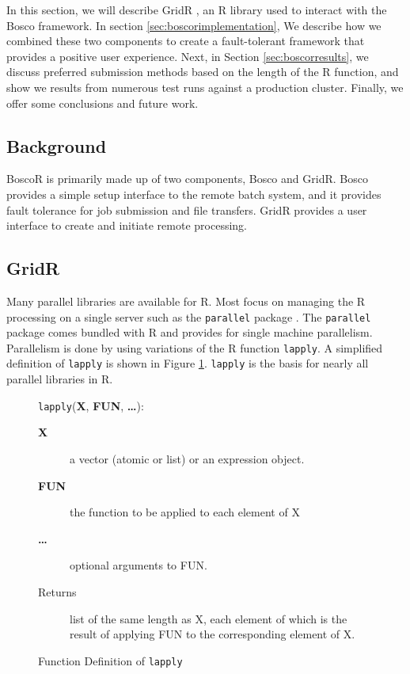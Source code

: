 In this section, we will describe GridR \cite{wegener2007gridr}, an R library used to interact with the Bosco framework.  In section \ref{sec:boscorimplementation}, We describe how we combined these two components to create a fault-tolerant framework that provides a positive user experience.  Next, in Section \ref{sec:boscorresults}, we discuss preferred submission methods based on the length of the R function, and show we results from numerous test runs against a production cluster.  Finally, we offer some conclusions and future work.

\subsection{Background}
BoscoR is primarily made up of two components, Bosco and GridR.  Bosco provides a simple setup interface to the remote batch system, and it provides fault tolerance for job submission and file transfers.  GridR provides a user interface to create and initiate remote processing.


\subsection{GridR}
Many parallel libraries are available for R.  Most focus on managing the R processing on a single server such as the \texttt{parallel} package \cite{rparallelpackage}.  The \texttt{parallel} package comes bundled with R and provides for single machine parallelism.  Parallelism is done by using variations of the R function \texttt{lapply}.  A simplified definition of \texttt{lapply} is shown in Figure \ref{lst:lapply}.  \texttt{lapply} is the basis for nearly all parallel libraries in R.  

\begin{figure}[h!t]
\begin{framed}
\texttt{lapply}(\textbf{X}, \textbf{FUN}, \textbf{\ldots}):
\begin{description}
\item[\textbf{X}] a vector (atomic or list) or an expression object.
\item[\textbf{FUN}] the function to be applied to each element of X
\item[\textbf{\ldots}] optional arguments to FUN.
\item[Returns] list of the same length as X, each element of which is the result of applying FUN to the corresponding element of X.
\end{description}
\end{framed}

\centering
\captionsetup{justification=centering}
\caption{Function Definition of \texttt{lapply}}
\label{lst:lapply}
\end{figure}

